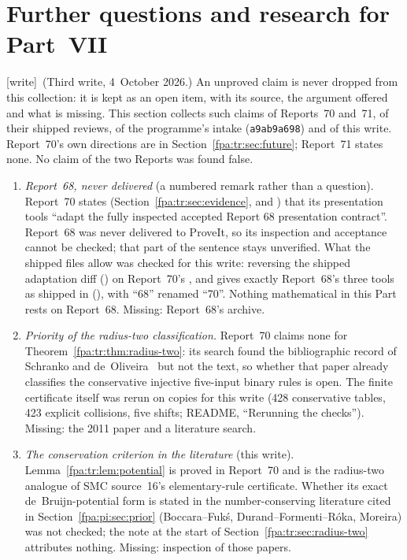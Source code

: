 \documentclass[11pt,a4paper]{article}
\numberwithin{equation}{section}
\newcommand{\wtag}{\textup{[write]}}
\begin{document}
\section{Further questions and research for Part~VII}\label{fpa:sec:partseven:questions}
\wtag\ (Third write, 4~October 2026.) An unproved claim is never dropped from this collection: it is kept as an open item, with its source, the argument offered and what is missing. This section collects such claims of Reports~70 and~71, of their shipped reviews, of the programme's intake (\texttt{a9ab9a698}) and of this write. Report~70's own directions are in Section~\ref{fpa:tr:sec:future}; Report~71 states none. No claim of the two Reports was found false.
\begin{enumerate}
\item \emph{Report~68, never delivered} (a numbered remark rather than a question). Report~70 states (Section~\ref{fpa:tr:sec:evidence}, and ) that its presentation tools ``adapt the fully inspected accepted Report 68 presentation contract''. Report~68 was never delivered to ProveIt, so its inspection and acceptance cannot be checked; that part of the sentence stays unverified. What the shipped files allow was checked for this write: reversing the shipped adaptation diff () on Report~70's ,  and  gives exactly Report~68's three tools as shipped in  (), with ``68'' renamed ``70''. Nothing mathematical in this Part rests on Report~68. Missing: Report~68's archive.
\item \emph{Priority of the radius-two classification.} Report~70 claims none for Theorem~\ref{fpa:tr:thm:radius-two}: its search found the bibliographic record of Schranko and de~Oliveira~\cite{fpa:tr:schranko} but not the text, so whether that paper already classifies the conservative injective five-input binary rules is open. The finite certificate itself was rerun on copies for this write (428 conservative tables, 423 explicit collisions, five shifts; README, ``Rerunning the checks''). Missing: the 2011 paper and a literature search.
\item \emph{The conservation criterion in the literature} (this write). Lemma~\ref{fpa:tr:lem:potential} is proved in Report~70 and is the radius-two analogue of SMC source~16's elementary-rule certificate. Whether its exact de~Bruijn-potential form is stated in the number-conserving literature cited in Section~\ref{fpa:pi:sec:prior} (Boccara--Fuk\'s, Durand--Formenti--R\'oka, Moreira) was not checked; the note at the start of Section~\ref{fpa:tr:sec:radius-two} attributes nothing. Missing: inspection of those papers.

\end{enumerate}
\end{document}
